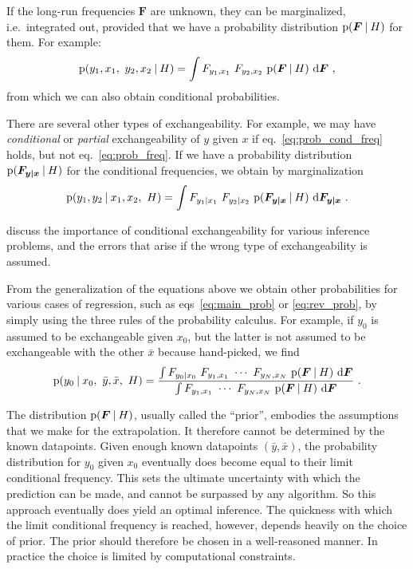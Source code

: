 \documentclass[\ifafour a4paper,12pt,\else a5paper,10pt,\fi%
onecolumn,oneside,article,%
british%
]{memoir}
\theoremstyle{remark}
\theoremstyle{innote}
\newcommand*{\di}{\mathrm{d}}%
\newcommand*{\p}{\mathrm{p}}%
\renewcommand*{\|}[1][]{\nonscript\:#1\vert\nonscript\:\mathopen{}}
\renewcommand*{\=}{\TextOrMath\texteq\eq}
\newcommand*{\eqn}{eq.}%
\newcommand*{\eqns}{eqs}%
\newcommand*{\ie}{{i.e.}}
\newcommand*{\wy}{\bar{y}}
\newcommand*{\wx}{\bar{x}}
\newcommand*{\yF}{\bm{F}}
\newcommand*{\yFyx}{\yF_{\bm{y\mid x}}}
\begin{document}
If the long-run frequencies $\yF$ are unknown, they can be marginalized,
\ie\ integrated out, provided that we have a probability distribution
$\p(\yF \| H)$ for them. For example:
\begin{equation}
  \label{eq:prob_freq_integr}
  \p(y_{1},x_{1},\ y_{2},x_{2}\| H) = \int F_{y_{1},x_{1}} \ 
  F_{y_{2},x_{2}} \ \p(\yF \| H)\ \di\yF \ ,
\end{equation}
from which we can also obtain conditional probabilities.

There are several other types of exchangeability. For example, we may have
\emph{conditional} or \emph{partial} exchangeability of $y$ given $x$ if
\eqn~\eqref{eq:prob_cond_freq} holds, but not \eqn~\eqref{eq:prob_freq}. If
we have a probability distribution $\p(\yFyx \| H)$ for the conditional
frequencies, we obtain by marginalization
\begin{equation}
  \label{eq:prob_cond_freq_integr}
  \p(y_{1}, y_{2}\| x_{1}, x_{2},\ H) = \int F_{y_{1}\|x_{1}} \ 
  F_{y_{2}\|x_{2}}\ \p(\yFyx \| H)\ \di\yFyx \ .
\end{equation}

\textcite{lindleyetal1981} discuss the importance of conditional
exchangeability for various inference problems, and the errors that arise
if the wrong type of exchangeability is assumed.

From the generalization of the equations above we obtain other
probabilities for various cases of regression, such as
\eqns~\eqref{eq:main_prob} or \eqref{eq:rev_prob}, by simply using the
three rules of the probability calculus. For example, if $y_{0}$ is assumed
to be exchangeable given $x_{0}$, but the latter is not assumed to be
exchangeable with the other $\wx$ because hand-picked, we find
\begin{equation}
  \label{eq:main_prob_exch}
  \p(y_{0} \| x_{0},\ \wy,\wx,\ H) =
  \frac{
    \int F_{y_{0}\|x_{0}} \ F_{y_{1},x_{1}} \  \dotsm \ 
  F_{y_{N},x_{N}} \ \p(\yF \| H)\ \di\yF
  }{
    \int F_{y_{1},x_{1}} \  \dotsm \ 
  F_{y_{N},x_{N}} \ \p(\yF \| H)\ \di\yF
  } \ .
\end{equation}

The distribution $\p(\yF \| H)$, usually called the \enquote{prior},
embodies the assumptions that we make for the extrapolation. It therefore
cannot be determined by the known datapoints. Given enough known datapoints
$(\wy,\wx)$, the probability distribution for $y_{0}$ given $x_{0}$
eventually does become equal to their limit conditional frequency. This
sets the ultimate uncertainty with which the prediction can be made, and
cannot be surpassed by any algorithm. So this approach eventually does
yield an optimal inference. The quickness with which the limit conditional
frequency is reached, however, depends heavily on the choice of prior. The
prior should therefore be chosen in a well-reasoned manner. In practice the
choice is limited by computational constraints.
\end{document}
